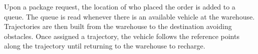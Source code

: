 Upon a package request, the location of who placed the order is added to a queue. The queue is read whenever there is an available vehicle at the warehouse. Trajectories are then built from the warehouse to the destination avoiding obstacles. Once assigned a trajectory, the vehicle follows the reference points along the trajectory until returning to the warehouse to recharge. 
